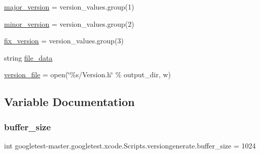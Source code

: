 \begin{DoxyCompactItemize}
\item 
\mbox{\hyperlink{namespacegoogletest-master_1_1googletest_1_1xcode_1_1_scripts_1_1versiongenerate_aa282013fe0422c36c685288c3d6e8077}{major\+\_\+version}} = version\+\_\+values.\+group(1)
\item 
\mbox{\hyperlink{namespacegoogletest-master_1_1googletest_1_1xcode_1_1_scripts_1_1versiongenerate_abf2bc0a85ae4b036d835d14b6633b0e6}{minor\+\_\+version}} = version\+\_\+values.\+group(2)
\item 
\mbox{\hyperlink{namespacegoogletest-master_1_1googletest_1_1xcode_1_1_scripts_1_1versiongenerate_ab0c82f8d81eab9ec7a8a86e62666ca71}{fix\+\_\+version}} = version\+\_\+values.\+group(3)
\item 
string \mbox{\hyperlink{namespacegoogletest-master_1_1googletest_1_1xcode_1_1_scripts_1_1versiongenerate_ad6a7eb7a90caa5d8cf20303dbb00de8c}{file\+\_\+data}}
\item 
\mbox{\hyperlink{namespacegoogletest-master_1_1googletest_1_1xcode_1_1_scripts_1_1versiongenerate_ad94122d5a75c9b1dafb9c082cd1d5a74}{version\+\_\+file}} = open(\char`\"{}\%s/Version.\+h\char`\"{} \% output\+\_\+dir, \textquotesingle{}w\textquotesingle{})
\end{DoxyCompactItemize}


\subsection{Variable Documentation}
\mbox{\label{namespacegoogletest-master_1_1googletest_1_1xcode_1_1_scripts_1_1versiongenerate_a84162d104e9a0426bb747ca62fac346f}} 
\subsubsection{\texorpdfstring{buffer\_size}{buffer\_size}}
{\footnotesize\ttfamily int googletest-\/master.\+googletest.\+xcode.\+Scripts.\+versiongenerate.\+buffer\+\_\+size = 1024}

\mbox{\label{namespacegoogletest-master_1_1googletest_1_1xcode_1_1_scripts_1_1versiongenerate_a2f37f17d0275f802f955fd2f49e13f9d}} 
